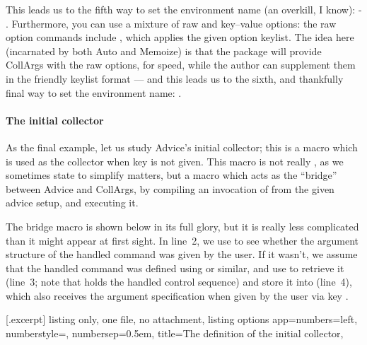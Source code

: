 \documentclass[a4paper,11pt]{article}
\begin{document}
\begin{center}
  \textcolor{gray}{}
\end{center}

This leads us to the fifth way to set the environment name (an overkill, I
know): \hyp
{}.
Furthermore, you can use a mixture of raw and key--value options: the raw
option commands include , which applies the given option
keylist.  The idea here (incarnated by both Auto and Memoize) is that the
package will provide CollArgs with the raw options, for speed, while the
author can supplement them in the friendly keylist format --- and this leads
us to the sixth, and thankfully final way to set the environment name:
.


\paragraph{The initial collector}

As the final example, let us study Advice's initial collector; this is a macro
which is used as the collector when key  is not given.
This macro is not really , as we sometimes state to
simplify matters, but a macro which acts as the ``bridge'' between Advice and
CollArgs, by compiling an invocation of  from the
given advice setup, and executing it.

The bridge macro is shown below in its full glory, but it is really less
complicated than it might appear at first sight.  In line~2, we use
 to see whether the argument structure of the handled
command was given by the user.  If it wasn't, we assume that the handled
command was defined using  or similar, and use
 to retrieve it (line~3; note that
 holds the handled control sequence) and store it into
 (line~4), which also receives the argument specification
when given by the user via key .

[.excerpt]{%
  listing only, one file, no attachment,
  listing options app={numbers=left, numberstyle=\tiny, numbersep=0.5em},
  title={The definition of the initial collector},
}
\end{document}
